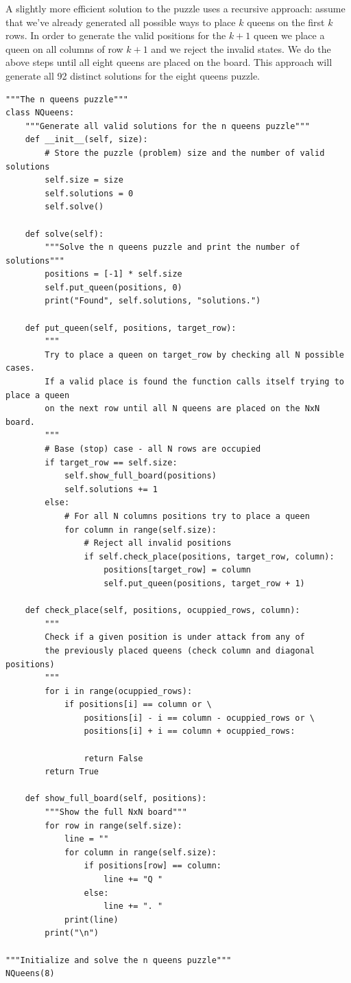 \documentclass[11pt,a4paper]{article}
\begin{document}
A slightly more efficient solution to the puzzle uses a recursive approach:
assume that we’ve already generated all possible ways to place $k$ queens on
the first $k$ rows. In order to generate the valid positions for the $k+1$
queen we place a queen on all columns of row $k+1$ and we reject the invalid
states. We do the above steps until all eight queens are placed on the board.
This approach will generate all 92 distinct solutions for the eight queens
puzzle.

\begin{verbatim}
"""The n queens puzzle"""
class NQueens:
    """Generate all valid solutions for the n queens puzzle"""
    def __init__(self, size):
        # Store the puzzle (problem) size and the number of valid solutions
        self.size = size
        self.solutions = 0
        self.solve()

    def solve(self):
        """Solve the n queens puzzle and print the number of solutions"""
        positions = [-1] * self.size
        self.put_queen(positions, 0)
        print("Found", self.solutions, "solutions.")

    def put_queen(self, positions, target_row):
        """
        Try to place a queen on target_row by checking all N possible cases.
        If a valid place is found the function calls itself trying to place a queen
        on the next row until all N queens are placed on the NxN board.
        """
        # Base (stop) case - all N rows are occupied
        if target_row == self.size:
            self.show_full_board(positions)
            self.solutions += 1
        else:
            # For all N columns positions try to place a queen
            for column in range(self.size):
                # Reject all invalid positions
                if self.check_place(positions, target_row, column):
                    positions[target_row] = column
                    self.put_queen(positions, target_row + 1)

    def check_place(self, positions, ocuppied_rows, column):
        """
        Check if a given position is under attack from any of
        the previously placed queens (check column and diagonal positions)
        """
        for i in range(ocuppied_rows):
            if positions[i] == column or \
                positions[i] - i == column - ocuppied_rows or \
                positions[i] + i == column + ocuppied_rows:

                return False
        return True

    def show_full_board(self, positions):
        """Show the full NxN board"""
        for row in range(self.size):
            line = ""
            for column in range(self.size):
                if positions[row] == column:
                    line += "Q "
                else:
                    line += ". "
            print(line)
        print("\n")

"""Initialize and solve the n queens puzzle"""
NQueens(8)
\end{verbatim}
\end{document}

